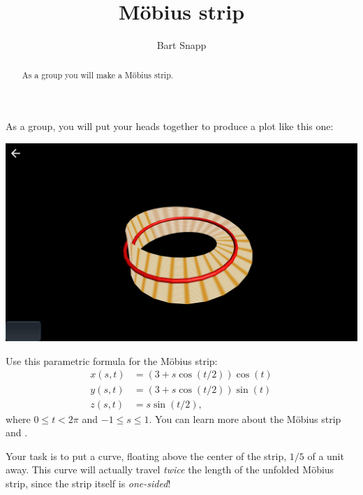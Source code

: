 \documentclass{ximera}
\author{Bart Snapp}
\title{M\"obius strip}
\begin{document}
\begin{abstract}
  As a group you will make a M\"obius strip.
\end{abstract}
\maketitle

As a group, you will put your heads together to produce a plot like this one:
\begin{image}
  \includegraphics{mobius.png}
\end{image}

Use this parametric formula for the M\"obius strip:
\begin{align*}
  x(s,t) &= (3+s\cos(t/2))\cos(t)\\
  y(s,t) &=(3+s\cos(t/2))\sin(t)\\
  z(s,t) &=s\sin(t/2),
\end{align*}
where $0\le t<2\pi$ and $-1\le s\le 1$. You can learn more about the
M\"obius strip  and .

Your task is to put a curve, floating above the center of the strip,
$1/5$ of a unit away. This curve will actually travel \textit{twice}
the length of the unfolded M\"obius strip, since the strip itself is
\textit{one-sided}!
\end{document}
